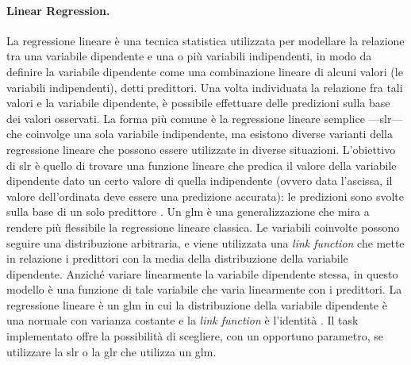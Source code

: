 \documentclass[12pt,a4paper,fleqn,titlepage]{report}
\begin{document}
        \paragraph{Linear Regression.}
        La regressione lineare è una tecnica statistica utilizzata per modellare la relazione tra una variabile dipendente e una o più variabili indipendenti, in modo da definire la variabile dipendente come una combinazione lineare di alcuni valori (le variabili indipendenti), detti predittori. Una volta individuata la relazione fra tali valori e la variabile dipendente, è possibile effettuare delle predizioni sulla base dei valori osservati. La forma più comune è la regressione lineare semplice —\gls{slr}— che coinvolge una sola variabile indipendente, ma esistono diverse varianti della regressione lineare che possono essere utilizzate in diverse situazioni.
        L'obiettivo di \gls{slr} è quello di trovare una funzione lineare che predica il valore della variabile dipendente dato un certo valore di quella indipendente (ovvero data l'ascissa, il valore dell'ordinata deve essere una predizione accurata): le predizioni sono svolte sulla base di un solo predittore \cite{seber:2012}.
        Un \gls{glm} è una generalizzazione che mira a rendere più flessibile la regressione lineare classica. Le variabili coinvolte possono seguire una distribuzione arbitraria, e viene utilizzata una \emph{link function} che mette in relazione i predittori con la media della distribuzione della variabile dipendente. Anziché variare linearmente la variabile dipendente stessa, in questo modello è una funzione di tale variabile che varia linearmente con i predittori. La regressione lineare è un \gls{glm} in cui la distribuzione della variabile dipendente è una normale con varianza costante e la \emph{link function} è l'identità \cite{dobson:2018}.
        Il task implementato offre la possibilità di scegliere, con un opportuno parametro, se utilizzare la \gls{slr} o la \gls{glr} che utilizza un \gls{glm}.
\end{document}
